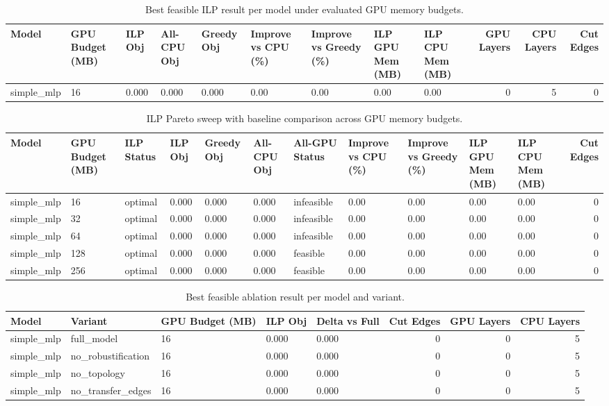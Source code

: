 \begin{table}[t]
\centering
\caption{Best feasible ILP result per model under evaluated GPU memory budgets.}
\label{tab:ilp-best-per-model}
\begin{tabular}{lllllllllrrr}
\toprule
Model & GPU Budget (MB) & ILP Obj & All-CPU Obj & Greedy Obj & Improve vs CPU (\%) & Improve vs Greedy (\%) & ILP GPU Mem (MB) & ILP CPU Mem (MB) & GPU Layers & CPU Layers & Cut Edges \\
\midrule
simple_mlp & 16 & 0.000 & 0.000 & 0.000 & 0.00 & 0.00 & 0.00 & 0.00 & 0 & 5 & 0 \\
\bottomrule
\end{tabular}

\end{table}

\begin{table}[t]
\centering
\caption{ILP Pareto sweep with baseline comparison across GPU memory budgets.}
\label{tab:ilp-budget-sweep}
\begin{tabular}{lllllllllllr}
\toprule
Model & GPU Budget (MB) & ILP Status & ILP Obj & Greedy Obj & All-CPU Obj & All-GPU Status & Improve vs CPU (\%) & Improve vs Greedy (\%) & ILP GPU Mem (MB) & ILP CPU Mem (MB) & Cut Edges \\
\midrule
simple_mlp & 16 & optimal & 0.000 & 0.000 & 0.000 & infeasible & 0.00 & 0.00 & 0.00 & 0.00 & 0 \\
simple_mlp & 32 & optimal & 0.000 & 0.000 & 0.000 & infeasible & 0.00 & 0.00 & 0.00 & 0.00 & 0 \\
simple_mlp & 64 & optimal & 0.000 & 0.000 & 0.000 & infeasible & 0.00 & 0.00 & 0.00 & 0.00 & 0 \\
simple_mlp & 128 & optimal & 0.000 & 0.000 & 0.000 & feasible & 0.00 & 0.00 & 0.00 & 0.00 & 0 \\
simple_mlp & 256 & optimal & 0.000 & 0.000 & 0.000 & feasible & 0.00 & 0.00 & 0.00 & 0.00 & 0 \\
\bottomrule
\end{tabular}

\end{table}

\begin{table}[t]
\centering
\caption{Best feasible ablation result per model and variant.}
\label{tab:ilp-ablation-best-per-variant}
\begin{tabular}{lllllrrr}
\toprule
Model & Variant & GPU Budget (MB) & ILP Obj & Delta vs Full & Cut Edges & GPU Layers & CPU Layers \\
\midrule
simple_mlp & full_model & 16 & 0.000 & 0.000 & 0 & 0 & 5 \\
simple_mlp & no_robustification & 16 & 0.000 & 0.000 & 0 & 0 & 5 \\
simple_mlp & no_topology & 16 & 0.000 & 0.000 & 0 & 0 & 5 \\
simple_mlp & no_transfer_edges & 16 & 0.000 & 0.000 & 0 & 0 & 5 \\
\bottomrule
\end{tabular}

\end{table}
